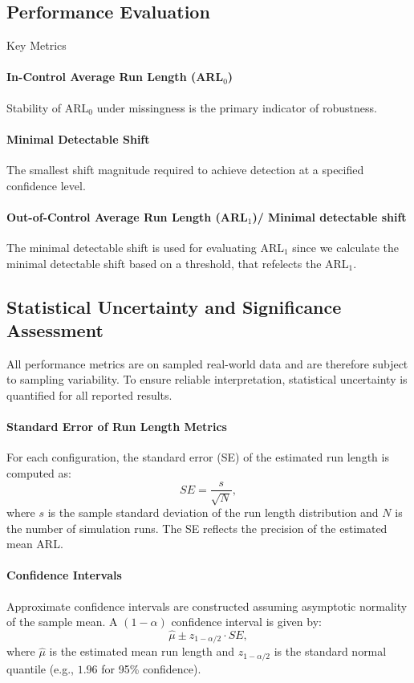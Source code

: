 \subsection{Performance Evaluation}

Key Metrics

\paragraph{In-Control Average Run Length (\ac{ARL}$_0$)}
Stability of \ac{ARL}$_0$ under missingness is the primary indicator of robustness.

\paragraph{Minimal Detectable Shift}
The smallest shift magnitude required to achieve detection at a specified confidence level.

\paragraph{Out-of-Control Average Run Length (\ac{ARL}$_1$)/ Minimal detectable shift}
The minimal detectable shift is used for evaluating \ac{ARL}$_1$ since we calculate the minimal detectable shift based on a threshold, that refelects the \ac{ARL}$_1$.

\subsection{Statistical Uncertainty and Significance Assessment}

All performance metrics are on sampled real-world data and are therefore
subject to sampling variability. To ensure reliable interpretation, statistical
uncertainty is quantified for all reported results.

\paragraph{Standard Error of Run Length Metrics}
For each configuration, the standard error (SE) of the estimated run length is computed as:
\begin{equation}
SE = \frac{s}{\sqrt{N}},
\end{equation}
where $s$ is the sample standard deviation of the run length distribution and $N$
is the number of simulation runs. The SE reflects the precision of the estimated
mean \ac{ARL}.

\paragraph{Confidence Intervals}
Approximate confidence intervals are constructed assuming asymptotic normality of
the sample mean. A $(1-\alpha)$ confidence interval is given by:
\begin{equation}
\hat{\mu} \pm z_{1-\alpha/2} \cdot SE,
\end{equation}
where $\hat{\mu}$ is the estimated mean run length and $z_{1-\alpha/2}$ is the
standard normal quantile (e.g., $1.96$ for 95\% confidence).

